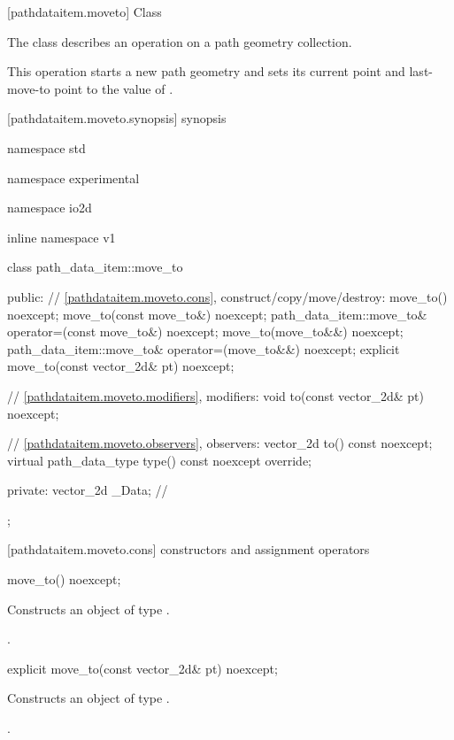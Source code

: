  [pathdataitem.moveto] {Class }

\pnum
{}
The class  describes an operation on a path geometry collection.

\pnum
This operation starts a new path geometry and sets its current point and last-move-to point to the value of .

 [pathdataitem.moveto.synopsis] { synopsis}

\begin{codeblock}
namespace std { namespace experimental { namespace io2d { inline namespace v1 {
  class path_data_item::move_to {
  public:
    // \ref{pathdataitem.moveto.cons}, construct/copy/move/destroy:
    move_to() noexcept;
    move_to(const move_to&) noexcept;
    path_data_item::move_to& operator=(const move_to&) noexcept;
    move_to(move_to&&) noexcept;
    path_data_item::move_to& operator=(move_to&&) noexcept;
    explicit move_to(const vector_2d& pt) noexcept;

    // \ref{pathdataitem.moveto.modifiers}, modifiers:
    void to(const vector_2d& pt) noexcept;

    // \ref{pathdataitem.moveto.observers}, observers:
    vector_2d to() const noexcept;
    virtual path_data_type type() const noexcept override;
    
  private:
    vector_2d _Data; // \expos
  };
} } } }
\end{codeblock}

 [pathdataitem.moveto.cons] { constructors and assignment operators}

\begin{itemdecl}
    move_to() noexcept;
\end{itemdecl}
\begin{itemdescr}
	\pnum
	\effects
	Constructs an object of type .
	
	\pnum
	\postconditions
	.
\end{itemdescr}

\begin{itemdecl}
    explicit move_to(const vector_2d& pt) noexcept;
\end{itemdecl}
\begin{itemdescr}
	\pnum
	\effects
	Constructs an object of type .
	
	\pnum
	\postconditions
	.
\end{itemdescr}

